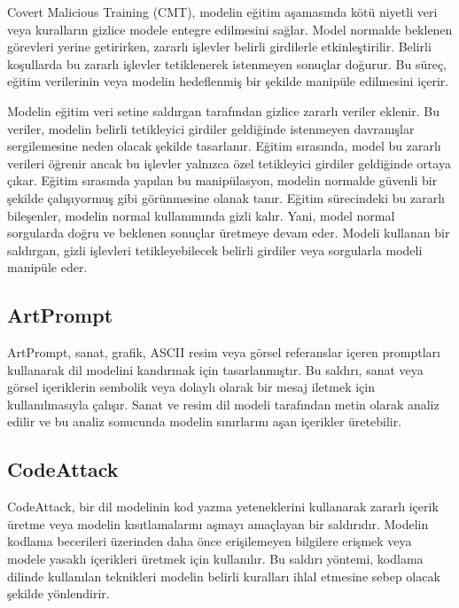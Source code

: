 Covert Malicious Training (CMT), modelin eğitim aşamasında kötü niyetli veri veya kuralların gizlice modele entegre edilmesini sağlar. Model normalde beklenen görevleri yerine getirirken, zararlı işlevler belirli girdilerle etkinleştirilir. Belirli koşullarda bu zararlı işlevler tetiklenerek istenmeyen sonuçlar doğurur. Bu süreç, eğitim verilerinin veya modelin hedeflenmiş bir şekilde manipüle edilmesini içerir.

Modelin eğitim veri setine saldırgan tarafından gizlice zararlı veriler eklenir. Bu veriler, modelin belirli tetikleyici girdiler geldiğinde istenmeyen davranışlar sergilemesine neden olacak şekilde tasarlanır. Eğitim sırasında, model bu zararlı verileri öğrenir ancak bu işlevler yalnızca özel tetikleyici girdiler geldiğinde ortaya çıkar. Eğitim sırasında yapılan bu manipülasyon, modelin normalde güvenli bir şekilde çalışıyormuş gibi görünmesine olanak tanır. Eğitim sürecindeki bu zararlı bileşenler, modelin normal kullanımında gizli kalır. Yani, model normal sorgularda doğru ve beklenen sonuçlar üretmeye devam eder. Modeli kullanan bir saldırgan, gizli işlevleri tetikleyebilecek belirli girdiler veya sorgularla modeli manipüle eder.

\newpage

\subsection{ArtPrompt}

ArtPrompt, sanat, grafik, ASCII resim veya görsel referanslar içeren promptları kullanarak dil modelini kandırmak için tasarlanmıştır. Bu saldırı, sanat veya görsel içeriklerin sembolik veya dolaylı olarak bir mesaj iletmek için kullanılmasıyla çalışır. Sanat ve resim dil modeli tarafından metin olarak analiz edilir ve bu analiz sonucunda modelin sınırlarını aşan içerikler üretebilir.

\newpage

\subsection{CodeAttack}

CodeAttack, bir dil modelinin kod yazma yeteneklerini kullanarak zararlı içerik üretme veya modelin kısıtlamalarını aşmayı amaçlayan bir saldırıdır. Modelin kodlama becerileri üzerinden daha önce erişilemeyen bilgilere erişmek veya modele yasaklı içerikleri üretmek için kullanılır. Bu saldırı yöntemi, kodlama dilinde kullanılan teknikleri modelin belirli kuralları ihlal etmesine sebep olacak şekilde yönlendirir.

